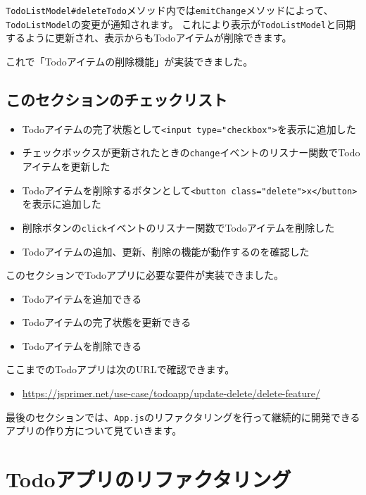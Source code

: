 \texttt{TodoListModel\#deleteTodo}メソッド内では\texttt{emitChange}メソッドによって、\texttt{TodoListModel}の変更が通知されます。
これにより表示が\texttt{TodoListModel}と同期するように更新され、表示からもTodoアイテムが削除できます。

これで「Todoアイテムの削除機能」が実装できました。

\hypertarget{section-checklist}{%
\subsection{このセクションのチェックリスト}\label{section-checklist}}

\begin{itemize}
\item
  Todoアイテムの完了状態として\texttt{<input type="checkbox">}を表示に追加した
\item
  チェックボックスが更新されたときの\texttt{change}イベントのリスナー関数でTodoアイテムを更新した
\item
  Todoアイテムを削除するボタンとして\texttt{<button class="delete">x</button>}を表示に追加した
\item
  削除ボタンの\texttt{click}イベントのリスナー関数でTodoアイテムを削除した
\item
  Todoアイテムの追加、更新、削除の機能が動作するのを確認した
\end{itemize}

このセクションでTodoアプリに必要な要件が実装できました。

\begin{itemize}
\item
  Todoアイテムを追加できる
\item
  Todoアイテムの完了状態を更新できる
\item
  Todoアイテムを削除できる
\end{itemize}

ここまでのTodoアプリは次のURLで確認できます。

\begin{itemize}
\item
  \url{https://jsprimer.net/use-case/todoapp/update-delete/delete-feature/}
\end{itemize}

最後のセクションでは、\texttt{App.js}のリファクタリングを行って継続的に開発できるアプリの作り方について見ていきます。

\hypertarget{todo-app-refactoring}{%
\section{Todoアプリのリファクタリング}\label{todo-app-refactoring}}


